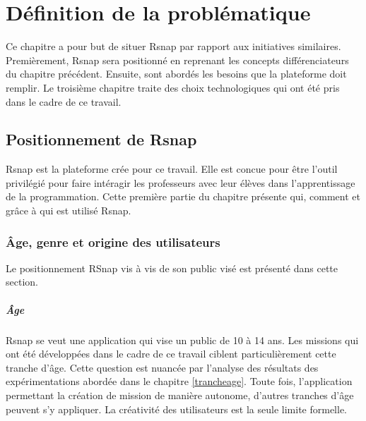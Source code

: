 \chapter{Définition de la problématique}
Ce chapitre a pour but de situer Rsnap par rapport aux initiatives similaires. Premièrement, Rsnap sera positionné en reprenant les concepts différenciateurs du chapitre précédent. Ensuite, sont abordés les besoins que la plateforme doit remplir. Le troisième chapitre traite des choix technologiques qui ont été pris dans le cadre de ce travail.

\section{Positionnement de Rsnap}
Rsnap est la plateforme crée pour ce travail. Elle est concue pour être l'outil privilégié pour faire intéragir les professeurs avec leur élèves dans l'apprentissage de la programmation.
Cette première partie du chapitre présente qui, comment et grâce à qui est utilisé Rsnap.

% 

\subsection{Âge, genre et origine des utilisateurs}
Le positionnement RSnap vis à vis de son public visé est présenté dans cette section.

\paragraph{Âge}
Rsnap se veut une application qui vise un public de 10 à 14 ans. Les missions qui ont été développées dans le cadre de ce travail ciblent particulièrement cette tranche d'âge. Cette question est nuancée par l'analyse des résultats des expérimentations abordée dans le chapitre \ref{trancheage}. %
Toute fois, l'application permettant la création de mission de manière autonome, d'autres tranches d'âge peuvent s'y appliquer. La créativité des utilisateurs est la seule limite formelle.

